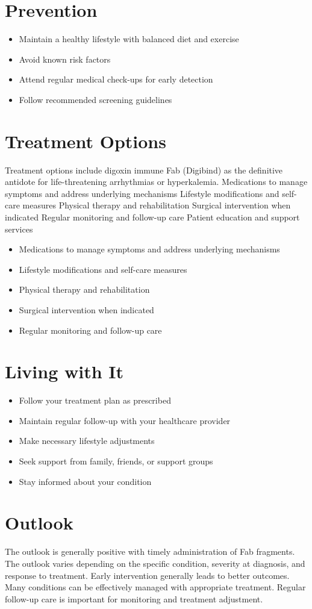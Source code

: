 \section{Prevention}
\begin{itemize}[noitemsep]
  \item Maintain a healthy lifestyle with balanced diet and exercise
  \item Avoid known risk factors
  \item Attend regular medical check-ups for early detection
  \item Follow recommended screening guidelines
\end{itemize}
\section{Treatment Options}
Treatment options include digoxin immune Fab (Digibind) as the definitive antidote for life-threatening arrhythmias or hyperkalemia. Medications to manage symptoms and address underlying mechanisms Lifestyle modifications and self-care measures Physical therapy and rehabilitation Surgical intervention when indicated Regular monitoring and follow-up care Patient education and support services

\begin{itemize}[noitemsep]
  \item Medications to manage symptoms and address underlying mechanisms
  \item Lifestyle modifications and self-care measures
  \item Physical therapy and rehabilitation
  \item Surgical intervention when indicated
  \item Regular monitoring and follow-up care
\end{itemize}
\section{Living with It}
\begin{itemize}[noitemsep]
  \item Follow your treatment plan as prescribed
  \item Maintain regular follow-up with your healthcare provider
  \item Make necessary lifestyle adjustments
  \item Seek support from family, friends, or support groups
  \item Stay informed about your condition
\end{itemize}
\section{Outlook}
The outlook is generally positive with timely administration of Fab fragments. The outlook varies depending on the specific condition, severity at diagnosis, and response to treatment. Early intervention generally leads to better outcomes. Many conditions can be effectively managed with appropriate treatment. Regular follow-up care is important for monitoring and treatment adjustment.
